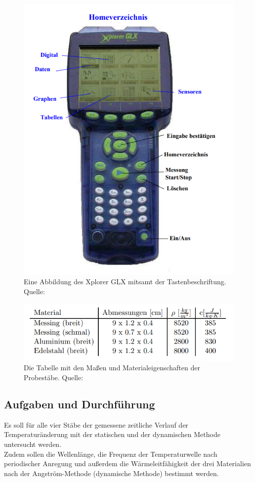 \begin{figure}[H]
    \centering
    \includegraphics[scale=0.6]{content/GLX.png}
    \caption{Eine Abbildung des Xplorer GLX mitsamt der Tastenbeschriftung. Quelle:\cite{sample}}
    \label{fig:GLX}
\end{figure}
\begin{figure}[H]
    \centering
    \includegraphics[scale=1]{content/StabDaten.png}
    \caption{Die Tabelle mit den Maßen und Materialeigenschaften der Probestäbe. Quelle:\cite{sample}}
    \label{fig:Masse}
\end{figure}
\subsection{Aufgaben und Durchführung}
\label{subsec:AufgDurch}
Es soll für alle vier Stäbe der gemessene zeitliche Verlauf der Temperaturänderung mit der statischen und
der dynamischen Methode untersucht werden. \\
Zudem sollen die Wellenlänge, die Frequenz der Temperaturwelle
nach periodischer Anregung und außerdem die Wärmeleitfähigkeit der drei Materialien nach
der Angström-Methode (dynamische Methode) bestimmt werden.
